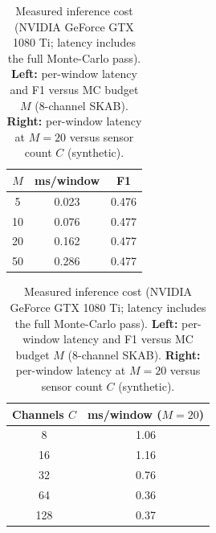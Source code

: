 \begin{table}[H]
\centering
\caption{Measured inference cost (NVIDIA GeForce GTX 1080 Ti; latency includes the full Monte-Carlo pass). \textbf{Left:} per-window latency and F1 versus MC budget $M$ (8-channel SKAB). \textbf{Right:} per-window latency at $M=20$ versus sensor count $C$ (synthetic).}
\label{table:latency_cost}
\setlength{\tabcolsep}{8pt}\small
\begin{minipage}[t]{0.48\linewidth}\centering
\begin{tabular}{ccc}
\toprule
\textbf{$M$} & \textbf{ms/window} & \textbf{F1} \\
\midrule
5  & 0.023 & 0.476 \\
10 & 0.076 & 0.477 \\
20 & 0.162 & 0.477 \\
50 & 0.286 & 0.477 \\
\bottomrule
\end{tabular}
\end{minipage}\hfill
\begin{minipage}[t]{0.48\linewidth}\centering
\begin{tabular}{cc}
\toprule
\textbf{Channels $C$} & \textbf{ms/window ($M{=}20$)} \\
\midrule
8   & 1.06 \\
16  & 1.16 \\
32  & 0.76 \\
64  & 0.36 \\
128 & 0.37 \\
\bottomrule
\end{tabular}
\end{minipage}
\end{table}
